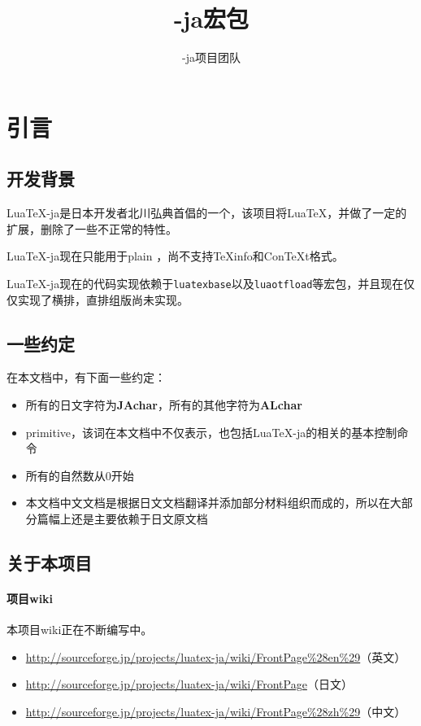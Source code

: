 \documentclass{ltjarticle}
\title{\LuaTeX-ja宏包}
\author{\LuaTeX-ja项目团队}
\date{}
\def\LuaTeX{Lua\TeX}
\def\pTeX{p\TeX}
\begin{document}
\maketitle
\tableofcontents
\section{引言}
\subsection{开发背景}
\LuaTeX-ja是日本开发者北川弘典首倡的一个，该项目将\LuaTeX，并做了一定的扩展，删除了一些不正常的特性。


\LuaTeX-ja现在只能用于plain ，尚不支持\TeX info和Con\TeX t格式。

\LuaTeX-ja现在的代码实现依赖于\verb!luatexbase!以及\verb!luaotfload!等宏包，并且现在仅仅实现了横排，直排组版尚未实现。
\subsection{一些约定}
在本文档中，有下面一些约定：
\begin{itemize}
\item 所有的日文字符为\textbf{JAchar}，所有的其他字符为\textbf{ALchar}
\item primitive，该词在本文档中不仅表示，也包括\LuaTeX-ja的相关的基本控制命令
\item 所有的自然数从0开始
\item 本文档中文文档是根据日文文档翻译并添加部分材料组织而成的，所以在大部分篇幅上还是主要依赖于日文原文档
\end{itemize}
\subsection{关于本项目}
\paragraph{项目wiki} 本项目wiki正在不断编写中。
\begin{itemize}
\item \url{http://sourceforge.jp/projects/luatex-ja/wiki/FrontPage%28en%29}（英文）
\item \url{http://sourceforge.jp/projects/luatex-ja/wiki/FrontPage}（日文）
\item \url{http://sourceforge.jp/projects/luatex-ja/wiki/FrontPage%28zh%29}（中文）
\end{itemize}
\end{document}

